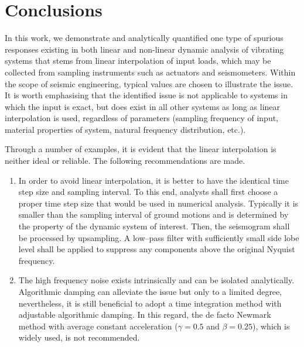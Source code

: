 \section{Conclusions}
In this work, we demonstrate and analytically quantified one type of spurious responses existing in both linear and non-linear dynamic analysis of vibrating systems that stems from linear interpolation of input loads, which may be collected from sampling instruments such as actuators and seismometers. Within the scope of seismic engineering, typical values are chosen to illustrate the issue. It is worth emphasising that the identified issue is not applicable to systems in which the input is exact, but does exist in all other systems as long as linear interpolation is used, regardless of parameters (sampling frequency of input, material properties of system, natural frequency distribution, etc.).

Through a number of examples, it is evident that the linear interpolation is neither ideal or reliable. The following recommendations are made.
\begin{enumerate}
\item In order to avoid linear interpolation, it is better to have the identical time step size and sampling interval. To this end, analysts shall first choose a proper time step size that would be used in numerical analysis. Typically it is smaller than the sampling interval of ground motions and is determined by the property of the dynamic system of interest. Then, the seismogram shall be processed by upsampling. A low--pass filter with sufficiently small side lobe level shall be applied to suppress any components above the original Nyquist frequency.
\item The high frequency noise exists intrinsically and can be isolated analytically. Algorithmic damping can alleviate the issue but only to a limited degree, nevertheless, it is still beneficial to adopt a time integration method with adjustable algorithmic damping. In this regard, the de facto Newmark method with average constant acceleration ($\gamma=0.5$ and $\beta=0.25$), which is widely used, is not recommended.
\end{enumerate}

